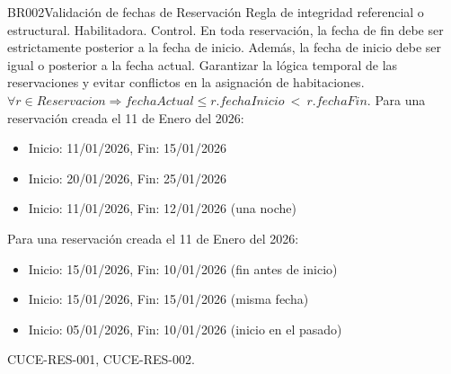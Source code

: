 \begin{BussinesRule}{BR002}{Validación de fechas de Reservación}
	\BRitem[Tipo:] Regla de integridad referencial o estructural.
	\BRitem[Clase:] Habilitadora.
	\BRitem[Nivel:] Control.
	\BRitem[Descripción:] En toda reservación, la fecha de fin debe ser estrictamente posterior a la fecha de inicio. Además, la fecha de inicio debe ser igual o posterior a la fecha actual.
	\BRitem[Motivación:] Garantizar la lógica temporal de las reservaciones y evitar conflictos en la asignación de habitaciones.
	\BRitem[Sentencia:] $\forall r \in Reservacion \Rightarrow fechaActual \leq r.fechaInicio~<~r.fechaFin$.
	 Para una reservación creada el 11 de Enero del 2026:
		\begin{itemize}
			\item Inicio: 11/01/2026, Fin: 15/01/2026
			\item Inicio: 20/01/2026, Fin: 25/01/2026
			\item Inicio: 11/01/2026, Fin: 12/01/2026 (una noche)
		\end{itemize}
	 Para una reservación creada el 11 de Enero del 2026:
		\begin{itemize}
			\item Inicio: 15/01/2026, Fin: 10/01/2026 (fin antes de inicio)
			\item Inicio: 15/01/2026, Fin: 15/01/2026 (misma fecha)
			\item Inicio: 05/01/2026, Fin: 10/01/2026 (inicio en el pasado)
		\end{itemize}
	 CUCE-RES-001, CUCE-RES-002.
\end{BussinesRule}

